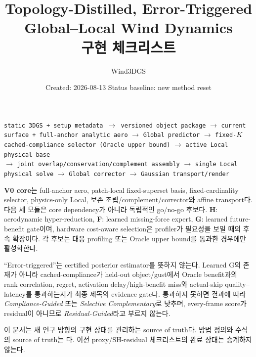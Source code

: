 \documentclass[10pt,a4paper]{article}
\title{\vspace{-1.7em}\textbf{Topology-Distilled, Error-Triggered\\Global--Local Wind Dynamics}\\[0.4em]\Large 구현 체크리스트}
\author{Wind3DGS}
\date{Created: 2026-08-13 \quad Status baseline: new method reset}
\newcommand{\code}[1]{\texttt{#1}}
\begin{document}
\maketitle

\begin{tcolorbox}[
  colback=LightBlue,
  colframe=blue!45!black,
  title=고정 Runtime Pipeline,
  fonttitle=\bfseries
]
\begin{center}
\code{static 3DGS + setup metadata $\rightarrow$ versioned object package}
\(\rightarrow\)
\code{current surface + full-anchor analytic aero}
\(\rightarrow\)
\code{Global predictor}
\(\rightarrow\)
\code{fixed-$K$ cached-compliance selector (Oracle upper bound)}
\(\rightarrow\)
\code{active Local physical base}
\\[0.25em]
\(\rightarrow\)
\code{joint overlap/conservation/complement assembly}
\(\rightarrow\)
\code{single Local physical solve}
\(\rightarrow\)
\code{Global corrector}
\(\rightarrow\)
\code{Gaussian transport/render}
\end{center}

\textbf{V0 core}는 full-anchor aero, patch-local fixed-superset basis,
fixed-cardinality selector, physics-only Local, 보존 조립/complement/corrector와 affine transport다.
다음 세 모듈은 core dependency가 아니라 독립적인 go/no-go 후보다.
\textbf{H}: aerodynamic hyper-reduction,
\textbf{F}: learned missing-force expert,
\textbf{G}: learned future-benefit gate이며, hardware cost-aware selection은 profiler가 필요성을 보일 때의 후속 확장이다.
각 후보는 대응 profiling 또는 Oracle upper bound를 통과한 경우에만 활성화한다.

``Error-triggered''는 certified posterior estimator를 뜻하지 않는다.
Learned G의 존재가 아니라 cached-compliance가 held-out object/gust에서 Oracle benefit과의
rank correlation, regret, activation delay/high-benefit miss와 actual-skip quality--latency를 통과하는지가
최종 제목의 evidence gate다. 통과하지 못하면 결과에 따라
\emph{Compliance-Guided} 또는 \emph{Selective Complementary}로 낮추며,
every-frame score가 residual이 아니므로 \emph{Residual-Guided}라고 부르지 않는다.

이 문서는 새 연구 방향의 구현 상태를 관리하는 source of truth다.
방법 정의와 수식의 source of truth는
다.
이전 proxy/SH-residual 체크리스트의 완료 상태는 승계하지 않는다.
\end{tcolorbox}
\end{document}
